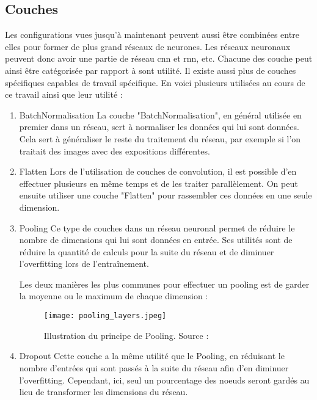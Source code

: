 \subsection{Couches}
Les configurations vues jusqu'à maintenant peuvent aussi être combinées entre elles pour former de plus grand réseaux de neurones.
Les réseaux neuronaux peuvent donc avoir une partie de réseau \gls{cnn} et \gls{rnn}, etc. Chacune des couche peut ainsi être catégorisée par
rapport à sont utilité.
Il existe aussi plus de couches spécifiques capables de travail spécifique. En voici plusieurs utilisées au cours de ce travail ainsi que leur utilité :

\begin{enumerate}
    \item BatchNormalisation 
	La couche "BatchNormalisation", en général utilisée en premier dans un réseau, sert à normaliser les données qui lui sont données.
	Cela sert à généraliser le reste du traitement du réseau, par exemple si l'on traitait des images avec des expositions différentes.

    \item Flatten
	Lors de l'utilisation de couches de convolution, il est possible d'en effectuer plusieurs en même temps et de les traiter parallèlement.
	On peut ensuite utiliser une couche "Flatten" pour rassembler ces données en une seule dimension.

    \item Pooling 
    Ce type de couches dans un réseau neuronal permet de réduire le nombre de dimensions qui lui sont données en entrée.
	Ses utilités sont de réduire la quantité de calculs pour la suite du réseau et de diminuer l'overfitting lors de l'entraînement.

	Les deux manières les plus communes pour effectuer un pooling est de garder la moyenne ou le maximum de chaque dimension :

	\begin{figure}[tbph!]
		\centering
		\texttt{[image: pooling\_layers.jpeg]}
		\caption[Illustration du principe de Pooling]{Illustration du principe de Pooling. Source : \cite{PoolingImage}}
	\end{figure}

    \item Dropout
	Cette couche a la même utilité que le Pooling, en réduisant le nombre d'entrées qui sont passés à la suite du réseau afin d'en diminuer l'overfitting.
	Cependant, ici, seul un pourcentage des noeuds seront gardés au lieu de transformer les dimensions du réseau.
\end{enumerate}

